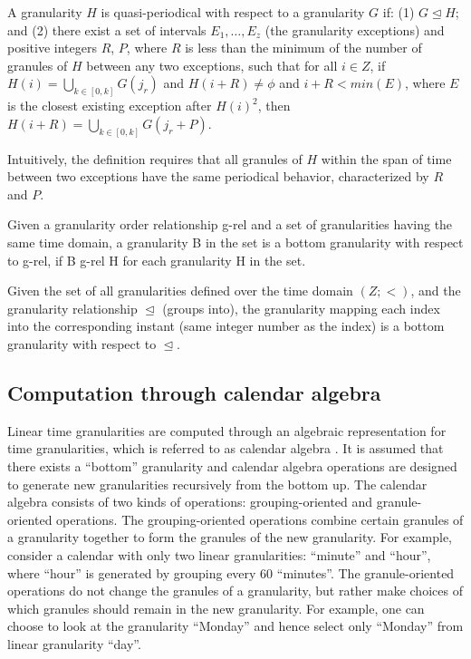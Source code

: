\documentclass[12pt]{article}
\begin{document}

\begin{definition}\label{def:quasi}
A granularity $H$ is quasi-periodical with respect to a granularity $G$ if:
(1) $G \trianglelefteq H$; and
(2) there exist a set of intervals $E_1,\dots,E_z$ (the granularity exceptions) and positive integers $R$, $P$, where $R$ is less than the minimum of the number of granules of $H$ between any two exceptions, such that for all $i \in Z$, if $H(i) = \bigcup_{k \in [0,k]} G(j_r)$  and $H (i + R) \neq \phi$ and $i + R < min(E)$, where $E$ is the closest existing exception after $H (i)^2$, then $H (i + R) = \bigcup_{k \in [0,k]} G(j_r + P)$.
\end{definition}

Intuitively, the definition requires that all granules of \(H\) within the span of time between two exceptions have the same periodical behavior, characterized by \(R\) and \(P\).


\begin{definition}\label{def:B}
Given a granularity order relationship g-rel and a set of granularities having the same time domain, a granularity B in the set is a bottom granularity with respect to g-rel, if B g-rel H for each granularity H in the set.
\end{definition}


Given the set of all granularities defined over the time domain \((Z; <)\), and the granularity relationship \(\trianglelefteq\) (groups into), the granularity mapping each index into the corresponding instant (same integer number as the index) is a bottom granularity with respect to \(\trianglelefteq\).

\hypertarget{computation-through-calendar-algebra}{%
\subsection{Computation through calendar algebra}\label{computation-through-calendar-algebra}}

Linear time granularities are computed through an algebraic representation for time granularities, which is referred to as calendar algebra \citep{Ning2002-tf}. It is assumed that there exists a ``bottom'' granularity and calendar algebra operations are designed to generate new granularities recursively from the bottom up. The calendar algebra consists of two kinds of operations: grouping-oriented and granule-oriented operations. The grouping-oriented operations combine certain granules of a granularity together to form the granules of the new granularity. For example, consider a calendar with only two linear granularities: ``minute'' and ``hour'', where ``hour'' is generated by grouping every \(60\) ``minutes''. The granule-oriented operations do not change the granules of a granularity, but rather make choices of which granules should remain in the new granularity. For example, one can choose to look at the granularity ``Monday'' and hence select only ``Monday'' from linear granularity ``day''.
\end{document}
